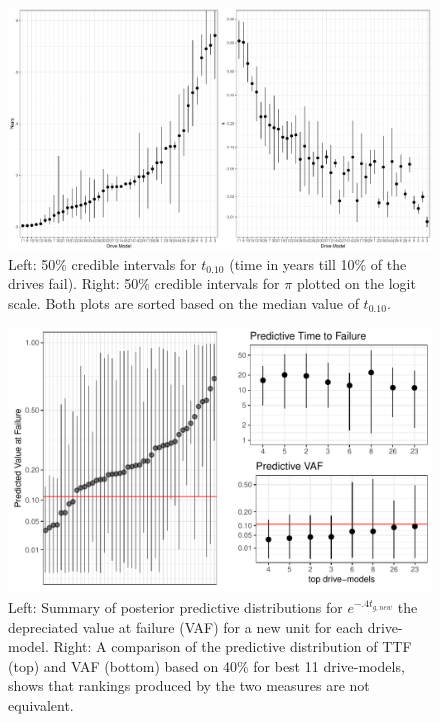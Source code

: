 \documentclass[12pt]{article}
\begin{document}
\begin{figure}[H]
  \centering
  \includegraphics[width=\textwidth]{b10andpi}
  \caption{Left: 50\% credible intervals for  $t_{0.10}$ (time in years till 10\% of the drives fail). Right: 50\% credible intervals for $\pi$ plotted on the logit scale.  Both plots are sorted based on the median value of $t_{0.10}$.}
  \label{fig4}
\end{figure}

\begin{figure}[H]
  \centering
  \includegraphics[width=.8\textwidth]{dm-eval}
  \caption{Left: Summary of posterior predictive distributions for $e^{-.4 t_{g,new}}$ the depreciated value at failure (VAF) for a new unit for each drive-model.
  Right: A comparison of the predictive distribution of TTF (top) and VAF (bottom) based on 40\% for best 11 drive-models, shows that rankings produced by the two measures are not equivalent.}
  \label{fig5}
\end{figure}
\end{document}

